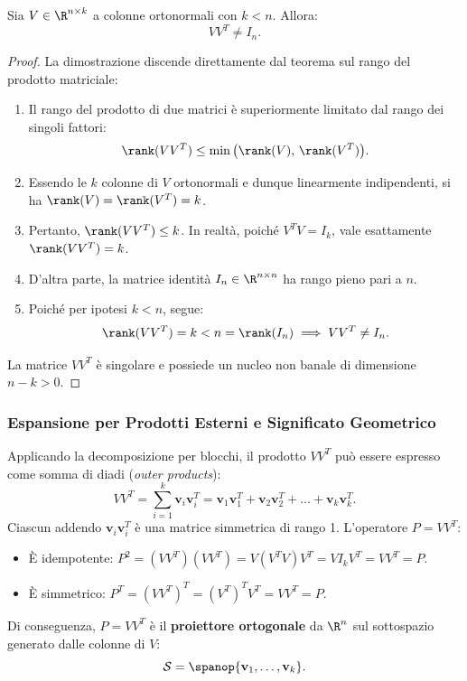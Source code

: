 \begin{theorem}
Sia $V \in \R^{n \times k}$ a colonne ortonormali con $k < n$. Allora:
\begin{equation}
    V V^T \neq I_n.
\end{equation}
\end{theorem}

\begin{proof}
La dimostrazione discende direttamente dal teorema sul rango del prodotto matriciale:
\begin{enumerate}
    \item Il rango del prodotto di due matrici \`e superiormente limitato dal rango dei singoli fattori:
    \begin{equation}
        \rank(V V^T) \le \min\big(\rank(V), \, \rank(V^T)\big).
    \end{equation}
    \item Essendo le $k$ colonne di $V$ ortonormali e dunque linearmente indipendenti, si ha $\rank(V) = \rank(V^T) = k$.
    \item Pertanto, $\rank(V V^T) \le k$. In realt\`a, poich\'e $V^T V = I_k$, vale esattamente $\rank(V V^T) = k$.
    \item D'altra parte, la matrice identit\`a $I_n \in \R^{n \times n}$ ha rango pieno pari a $n$.
    \item Poich\'e per ipotesi $k < n$, segue:
    \begin{equation}
        \rank(V V^T) = k < n = \rank(I_n) \implies V V^T \neq I_n.
    \end{equation}
\end{enumerate}
La matrice $V V^T$ \`e singolare e possiede un nucleo non banale di dimensione $n - k > 0$.
\end{proof}

\subsubsection{Espansione per Prodotti Esterni e Significato Geometrico}
Applicando la decomposizione per blocchi, il prodotto $V V^T$ pu\`o essere espresso come somma di diadi (\textit{outer products}):
\begin{equation}
    V V^T = \sum_{i=1}^k \mathbf{v}_i \mathbf{v}_i^T = \mathbf{v}_1 \mathbf{v}_1^T + \mathbf{v}_2 \mathbf{v}_2^T + \dots + \mathbf{v}_k \mathbf{v}_k^T.
\end{equation}
Ciascun addendo $\mathbf{v}_i \mathbf{v}_i^T$ \`e una matrice simmetrica di rango 1. L'operatore $P = V V^T$:
\begin{itemize}
    \item \`E idempotente: $P^2 = (V V^T)(V V^T) = V (V^T V) V^T = V I_k V^T = V V^T = P$.
    \item \`E simmetrico: $P^T = (V V^T)^T = (V^T)^T V^T = V V^T = P$.
\end{itemize}
Di conseguenza, $P = V V^T$ \`e il \textbf{proiettore ortogonale} da $\R^n$ sul sottospazio generato dalle colonne di $V$:
\begin{equation}
    \mathcal{S} = \spanop\{\mathbf{v}_1, \dots, \mathbf{v}_k\}.
\end{equation}

